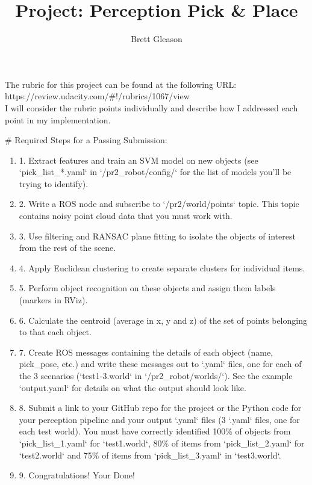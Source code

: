 \documentclass{article}
\begin{document}
\title{Project: Perception Pick \& Place}
\author{Brett Gleason}

\maketitle

The rubric for this project can be found at the following URL: \\
https://review.udacity.com/#!/rubrics/1067/view \\
I will consider the rubric points individually and describe how I addressed each point in my implementation.

# Required Steps for a Passing Submission:

\begin{enumerate}
    \item 1. Extract features and train an SVM model on new objects (see `pick\_list\_*.yaml` in `/pr2\_robot/config/` for the list of models you'll be trying to identify). 
    \item 2. Write a ROS node and subscribe to `/pr2/world/points` topic. This topic contains noisy point cloud data that you must work with.
    \item 3. Use filtering and RANSAC plane fitting to isolate the objects of interest from the rest of the scene.
    \item 4. Apply Euclidean clustering to create separate clusters for individual items.
    \item 5. Perform object recognition on these objects and assign them labels (markers in RViz).
    \item 6. Calculate the centroid (average in x, y and z) of the set of points belonging to that each object.
    \item 7. Create ROS messages containing the details of each object (name, pick\_pose, etc.) and write these messages out to `.yaml` files, one for each of the 3 scenarios (`test1-3.world` in `/pr2\_robot/worlds/`).  See the example `output.yaml` for details on what the output should look like.  
    \item 8. Submit a link to your GitHub repo for the project or the Python code for your perception pipeline and your output `.yaml` files (3 `.yaml` files, one for each test world).  You must have correctly identified 100\% of objects from `pick\_list\_1.yaml` for `test1.world`, 80\% of items from `pick\_list\_2.yaml` for `test2.world` and 75\% of items from `pick\_list\_3.yaml` in `test3.world`.
    \item 9. Congratulations!  Your Done!
\end{enumerate}
\end{document}
